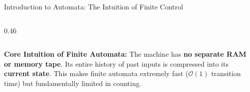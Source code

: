 \documentclass[aspectratio=169, 10pt]{beamer}
\begin{document}
\begin{frame}{Introduction to Automata: The Intuition of Finite Control}
\begin{columns}[T]
\begin{column}{0.46\textwidth}
\begin{center}
      \end{center}
    \end{column}
  \end{columns}
  
  \vspace{0.08cm}
  \begin{tcolorbox}[examplecard]
    {\scriptsize\textbf{Core Intuition of Finite Automata:} The machine has \textbf{no separate RAM or memory tape}. Its entire history of past inputs is compressed into its \textbf{current state}. This makes finite automata extremely fast ($\mathcal{O}(1)$ transition time) but fundamentally limited in counting.}
  \end{tcolorbox}
\end{frame}
\end{document}
